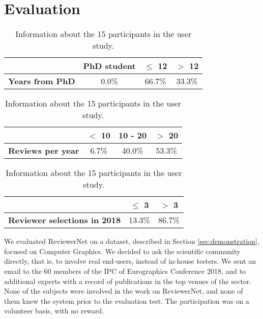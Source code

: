 \chapter{Evaluation}\label{sec:evaluation}

\begin{table}[!t]
	\renewcommand{\arraystretch}{1.3}
	\caption{Information about the 15 participants in the user study.}
	\vspace{0.3cm}
	\label{table:infotesters}
	\begin{subtable}[t]{.99\linewidth}
		\centering%
		\begin{tabular}{|c|c|c|c|}
			\hline
			\ & PhD student & $\leq$ 12 & $>$ 12\\
			\hline
			{\bf Years from PhD} & 0.0\% & 66.7\% &  33.3\% \\
			\hline
		\end{tabular}
  \end{subtable}
	\par\bigskip
  \begin{subtable}[t]{.99\linewidth}
		\centering
		\begin{tabular}{|c|c|c|c|}
			\hline
			\ & $<$ 10 & 10 - 20 & $>$ 20\\
			\hline
			{\bf Reviews per year} & 6.7\% & 40.0\% &  53.3\% \\
			\hline
		\end{tabular}
  \end{subtable}
	\par\bigskip
  \begin{subtable}[t]{.99\linewidth}
		\centering
		\begin{tabular}{|c|c|c|}
			\hline
			\ & $\leq$ 3 & $>$ 3\\
			\hline
			{\bf Reviewer selections in 2018} & 13.3\% &  86.7\% \\
			\hline
		\end{tabular}
  \end{subtable}
\end{table}




We evaluated ReviewerNet on a dataset, described in Section \ref{sec:demonstration}, focused on Computer Graphics. We decided to ask the scientific community directly, that is, to involve real end-users, instead of in-house testers. We sent an email to the 60 members of the IPC of Eurographics Conference 2018, and to additional experts with a record of publications in the top venues of the sector. None of the subjects were involved in the work on ReviewerNet, and none of them knew the system prior to the evaluation test. The participation was on a volunteer basis, with no reward. 


